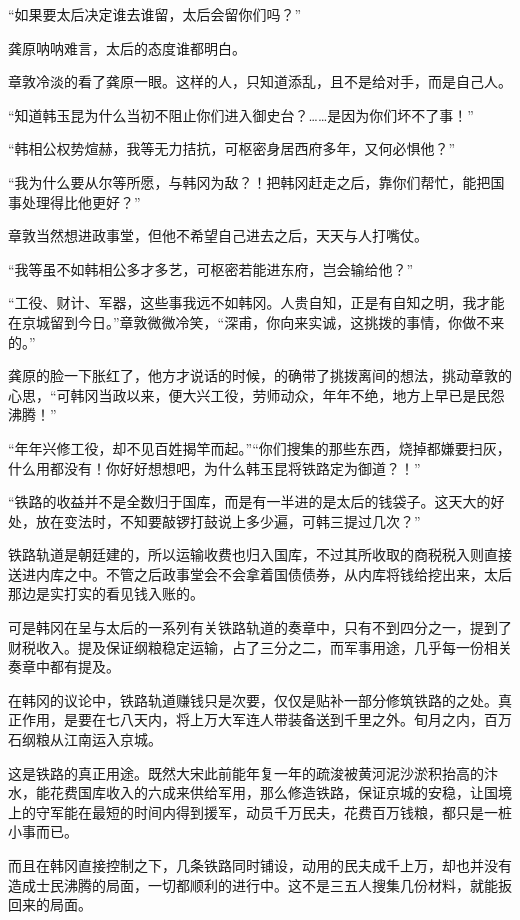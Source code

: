 “如果要太后决定谁去谁留，太后会留你们吗？”

龚原呐呐难言，太后的态度谁都明白。

章敦冷淡的看了龚原一眼。这样的人，只知道添乱，且不是给对手，而是自己人。

“知道韩玉昆为什么当初不阻止你们进入御史台？……是因为你们坏不了事！”

“韩相公权势煊赫，我等无力拮抗，可枢密身居西府多年，又何必惧他？”

“我为什么要从尔等所愿，与韩冈为敌？！把韩冈赶走之后，靠你们帮忙，能把国事处理得比他更好？”

章敦当然想进政事堂，但他不希望自己进去之后，天天与人打嘴仗。

“我等虽不如韩相公多才多艺，可枢密若能进东府，岂会输给他？”

“工役、财计、军器，这些事我远不如韩冈。人贵自知，正是有自知之明，我才能在京城留到今日。”章敦微微冷笑，“深甫，你向来实诚，这挑拨的事情，你做不来的。”

龚原的脸一下胀红了，他方才说话的时候，的确带了挑拨离间的想法，挑动章敦的心思，“可韩冈当政以来，便大兴工役，劳师动众，年年不绝，地方上早已是民怨沸腾！”

“年年兴修工役，却不见百姓揭竿而起。”“你们搜集的那些东西，烧掉都嫌要扫灰，什么用都没有！你好好想想吧，为什么韩玉昆将铁路定为御道？！”

“铁路的收益并不是全数归于国库，而是有一半进的是太后的钱袋子。这天大的好处，放在变法时，不知要敲锣打鼓说上多少遍，可韩三提过几次？”

铁路轨道是朝廷建的，所以运输收费也归入国库，不过其所收取的商税税入则直接送进内库之中。不管之后政事堂会不会拿着国债债券，从内库将钱给挖出来，太后那边是实打实的看见钱入账的。

可是韩冈在呈与太后的一系列有关铁路轨道的奏章中，只有不到四分之一，提到了财税收入。提及保证纲粮稳定运输，占了三分之二，而军事用途，几乎每一份相关奏章中都有提及。

在韩冈的议论中，铁路轨道赚钱只是次要，仅仅是贴补一部分修筑铁路的之处。真正作用，是要在七八天内，将上万大军连人带装备送到千里之外。旬月之内，百万石纲粮从江南运入京城。

这是铁路的真正用途。既然大宋此前能年复一年的疏浚被黄河泥沙淤积抬高的汴水，能花费国库收入的六成来供给军用，那么修造铁路，保证京城的安稳，让国境上的守军能在最短的时间内得到援军，动员千万民夫，花费百万钱粮，都只是一桩小事而已。

而且在韩冈直接控制之下，几条铁路同时铺设，动用的民夫成千上万，却也并没有造成士民沸腾的局面，一切都顺利的进行中。这不是三五人搜集几份材料，就能扳回来的局面。

